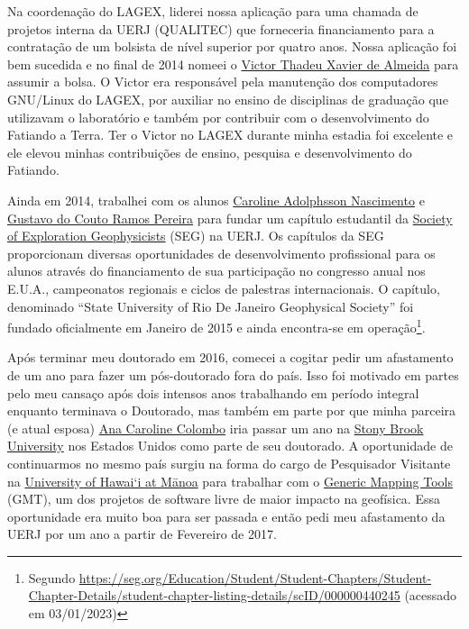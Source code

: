 \documentclass[10pt,a4paper,oneside]{book}
\newcommand{\UHM}{University of Hawai`i at M\={a}noa}
\begin{document}
Na coordenação do LAGEX, liderei nossa aplicação para uma chamada de projetos
interna da UERJ (QUALITEC) que forneceria financiamento para a
contratação de um bolsista de nível superior por quatro anos.
Nossa aplicação foi bem sucedida e no final de 2014 nomeei o
\href{https://www.linkedin.com/in/victorxalmeida/}{Victor Thadeu Xavier de Almeida}
para assumir a bolsa.
O Victor era responsável pela manutenção dos computadores GNU/Linux do LAGEX,
por auxiliar no ensino de disciplinas de graduação que utilizavam o
laboratório e também por contribuir com o desenvolvimento do Fatiando a Terra.
Ter o Victor no LAGEX durante minha estadia foi excelente e ele elevou minhas
contribuições de ensino, pesquisa e desenvolvimento do Fatiando.

Ainda em 2014, trabalhei com os alunos
\href{https://www.linkedin.com/in/caroline-adolphsson-61723137/}{Caroline Adolphsson Nascimento}
e \href{https://www.linkedin.com/in/gustavo-pereira-780839111/}{Gustavo do Couto Ramos Pereira}
para fundar um capítulo estudantil da
\href{https://seg.org}{Society of Exploration Geophysicists} (SEG) na UERJ.
Os capítulos da SEG proporcionam diversas oportunidades de desenvolvimento
profissional para os alunos através do financiamento de sua participação no
congresso anual nos E.U.A., campeonatos regionais e ciclos de palestras
internacionais.
O capítulo, denominado ``State University of Rio De Janeiro Geophysical
Society'' foi fundado oficialmente em Janeiro de 2015 e ainda encontra-se em
operação\footnote{Segundo \url{https://seg.org/Education/Student/Student-Chapters/Student-Chapter-Details/student-chapter-listing-details/scID/000000440245} (acessado em 03/01/2023)}.

Após terminar meu doutorado em 2016, comecei a cogitar pedir um afastamento de
um ano para fazer um pós-doutorado fora do país.
Isso foi motivado em partes pelo meu cansaço após dois intensos anos
trabalhando em período integral enquanto terminava o Doutorado, mas também em
parte por que minha parceira (e atual esposa)
\href{https://www.acarolcolombo.com/}{Ana Caroline Colombo} iria passar um ano
na \href{https://www.stonybrook.edu/}{Stony Brook University} nos Estados
Unidos como parte de seu doutorado.
A oportunidade de continuarmos no mesmo país surgiu na forma do cargo de
Pesquisador Visitante na
\href{https://www.hawaii.edu/}{\UHM{}} para trabalhar com o
\href{https://www.generic-mapping-tools.org/}{Generic Mapping Tools} (GMT),
um dos projetos de software livre de maior impacto na geofísica.
Essa oportunidade era muito boa para ser passada e então pedi meu afastamento
da UERJ por um ano a partir de Fevereiro de 2017.
\end{document}
